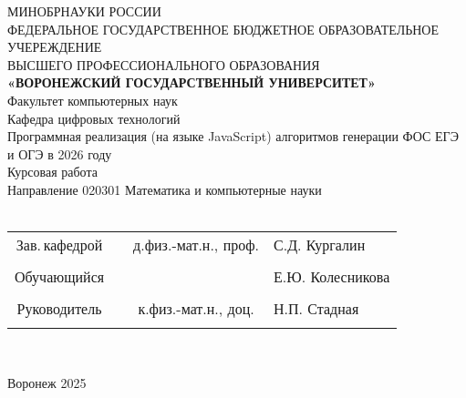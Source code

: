 
\begin{center}
	\hfill \break
	\large{МИНОБРНАУКИ РОССИИ}\\
	\footnotesize{ФЕДЕРАЛЬНОЕ ГОСУДАРСТВЕННОЕ БЮДЖЕТНОЕ ОБРАЗОВАТЕЛЬНОЕ УЧЕРЕЖДЕНИЕ}\\
	\footnotesize{ВЫСШЕГО ПРОФЕССИОНАЛЬНОГО ОБРАЗОВАНИЯ}\\
	\small{\textbf{«ВОРОНЕЖСКИЙ ГОСУДАРСТВЕННЫЙ УНИВЕРСИТЕТ»}}\\
	\hfill \break
	\normalsize{Факультет компьютерных наук}\\
	\hfill \break
	\normalsize{Кафедра цифровых технологий}\\
	\hfill\break
	\hfill \break
	\hfill \break
	\hfill \break
	\large{Программная реализация (на языке JavaScript) алгоритмов генерации ФОС ЕГЭ и ОГЭ в 2026 году}\\
	\hfill \break
	\hfill \break
	\hfill \break
	\hfill \break
	\hfill \break
	\normalsize{Курсовая работа\\
		\hfill \break
		Направление  020301 Математика и компьютерные науки\\

		\hfill \break
	}\\
	\hfill \break
	\hfill \break
\end{center}
\hfill \break

\normalsize{
	\begin{tabular}{cccl}
		Зав.\,кафедрой & \underline{\hspace{3cm}} & д.физ.-мат.н.,  проф. & С.Д. Кургалин    \\\\
		Обучающийся  & \underline{\hspace{3cm}} &                       & Е.Ю. Колесникова \\\\
		Руководитель & \underline{\hspace{3cm}} & к.физ.-мат.н.,      доц. & Н.П. Стадная    \\\\
	\end{tabular}
}\\
\hfill \break
\hfill \break
\begin{center} Воронеж 2025 \end{center}
\thispagestyle{empty} %

